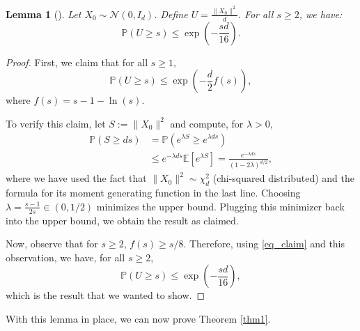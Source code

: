 \documentclass[a4paper,11pt]{article}
\theoremstyle{plain}
\newtheorem{lemmainner}[theoreminner]{Lemma}
\theoremstyle{definition}
\newenvironment{lemma}[1][]
  {\begin{mdframed}[style=lemmastyle]\begin{lemmainner}[#1]}
  {\end{lemmainner}\end{mdframed}}
\begin{document}
\begin{lemma} \label{app_lem2}
    Let $X_0 \sim \mathcal{N}(0, I_d)$. Define $U = \frac{\|X_0\|^2}{d}.$ 
    For all $s \geq 2$, we have:
    $$\mathbb{P}(U \geq s) \leq \exp\left(-\frac{sd}{16} \right).$$
\end{lemma}
\begin{proof}
    First, we claim that for all $s \geq 1$, 
    \begin{equation} \label{eq_claim}
        \mathbb{P}\left(U \geq s \right) \leq \exp\left( -\frac{d}{2} f(s)  \right),
    \end{equation}
    where $f(s) = s - 1 - \ln(s)$.

To verify this claim, let $S := \|X_0\|^2$ and compute, for $\lambda > 0$, 
\begin{align}
    \mathbb{P}(S \geq ds) &=  \mathbb{P}(e^{\lambda S} \geq e^{\lambda d s}) \\
    &\leq e^{-\lambda d s} \mathbb{E}[e^{\lambda S}] = \frac{ e^{-\lambda d s}}{(1-2\lambda)^{d/2}},
\end{align}
where we have used the fact that $\|X_0\|^2 \sim \chi_d^2$ (chi-squared distributed) and the formula for its moment generating function in the last line. 
Choosing $\lambda = \frac{s-1}{2s} \in (0,1/2)$ minimizes the upper bound. Plugging this minimizer back into the upper bound, we obtain the result as claimed.

Now, observe that for $s \geq 2$, $f(s) \geq s/8$. Therefore, using \eqref{eq_claim} and this observation, we have, for all $s \geq 2$,
 \begin{equation}
        \mathbb{P}\left(U \geq s \right) \leq  \exp\left(-\frac{sd}{16} \right),
    \end{equation}
which is the result that we wanted to show.
\end{proof}

With this lemma in place, we can now prove Theorem \ref{thm1}. 
\end{document}
